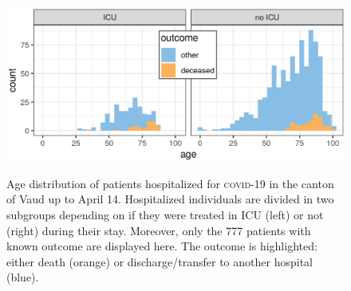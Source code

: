 \begin{figure}[!htb]%
    \centering
        \caption[Age distribution of patients hospitalized for \textsc{covid}-19 in the canton of Vaud]{Age distribution of patients hospitalized for \textsc{covid}-19 in the canton of Vaud up to April 14. Hospitalized individuals are divided in two subgroups depending on if they were treated in ICU (left) or not (right) during their stay. Moreover, only the 777 patients with known outcome are displayed here. The outcome is highlighted:  either death (orange) or discharge/transfer to another hospital (blue).}
    \includegraphics{fig_covid-switzerland-npi/fig_supp/VD_hist_age_mod.png}
    \label{fig:vdage}
\end{figure}
